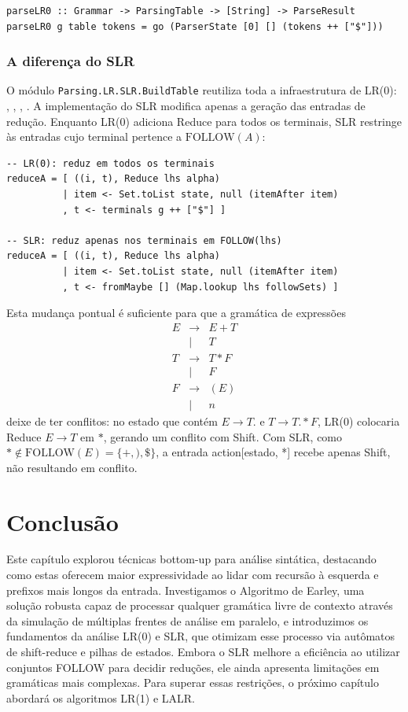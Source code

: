 \begin{verbatim}
parseLR0 :: Grammar -> ParsingTable -> [String] -> ParseResult
parseLR0 g table tokens = go (ParserState [0] [] (tokens ++ ["$"]))
\end{verbatim}

\subsubsection{A diferença do SLR}

O módulo \verb|Parsing.LR.SLR.BuildTable|
reutiliza toda a infraestrutura de LR(0):
,
, ,
. A implementação do SLR modifica apenas a geração
das entradas de redução. Enquanto LR(0) adiciona Reduce para todos os
terminais, SLR restringe às entradas cujo terminal pertence a
\(\mathrm{FOLLOW}(A)\):

\begin{verbatim}
-- LR(0): reduz em todos os terminais
reduceA = [ ((i, t), Reduce lhs alpha)
          | item <- Set.toList state, null (itemAfter item)
          , t <- terminals g ++ ["$"] ]

-- SLR: reduz apenas nos terminais em FOLLOW(lhs)
reduceA = [ ((i, t), Reduce lhs alpha)
          | item <- Set.toList state, null (itemAfter item)
          , t <- fromMaybe [] (Map.lookup lhs followSets) ]
\end{verbatim}

Esta mudança pontual é suficiente para que a gramática de expressões
\[
  \begin{array}{lcl}
    E & \to  & E + T \\
    & \mid & T \\
    T & \to  & T * F \\
    & \mid & F \\
    F & \to  & (E) \\
    & \mid & n
  \end{array}
\]
deixe de ter conflitos: no estado que contém \(E \to T.\) e \(T
\to T.*F\), LR(0) colocaria Reduce \(E \to T\) em
$*$, gerando um conflito com Shift. Com SLR,
como \(* \notin \mathrm{FOLLOW}(E) = \{+, ), \$\}\), a entrada
action[estado, *] recebe apenas Shift, não resultando em conflito.

\section{Conclusão}

Este capítulo explorou técnicas bottom-up para análise sintática,
destacando como estas oferecem maior expressividade ao lidar com
recursão à esquerda e prefixos mais longos da entrada. Investigamos o
Algoritmo de Earley, uma solução robusta capaz de processar qualquer
gramática livre de contexto através da simulação de múltiplas frentes
de análise em paralelo, e introduzimos os fundamentos da análise
LR(0) e SLR, que otimizam esse processo via autômatos de shift-reduce
e pilhas de estados. Embora o SLR melhore a eficiência ao utilizar
conjuntos FOLLOW para decidir reduções, ele ainda apresenta
limitações em gramáticas mais complexas. Para superar essas
restrições, o próximo capítulo abordará os algoritmos LR(1) e LALR.
